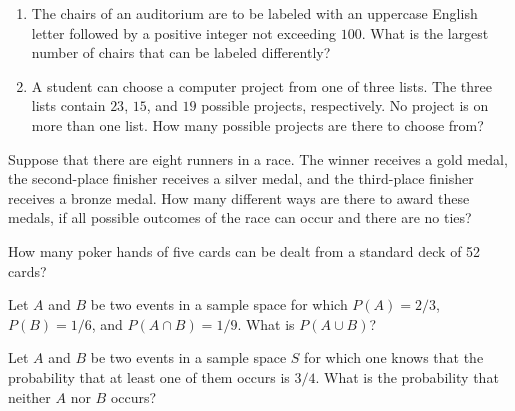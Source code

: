 \documentclass[12pt,reqno]{amsart}
\begin{document}
\bigskip
\prob

\begin{enumerate}
\item The chairs of an auditorium are to be labeled with an uppercase English letter followed by a positive integer not exceeding $100$. What is the largest number of chairs that can be labeled differently?\vfill



\item A student can choose a computer project from one of three lists. The three lists contain $23$, $15$, and $19$ possible projects, respectively. No project is on more than one list. How many possible projects are there to choose from?\vfill


\end{enumerate}









\bigskip
\prob Suppose that there are eight runners in a race. The winner receives a gold medal, the second-place finisher receives a silver medal, and the third-place finisher receives a bronze medal. How many different ways are there to award these medals, if all possible outcomes of the race can occur and there are no ties?\vfill









\prob How many poker hands of five cards can be dealt from a standard deck of 52 cards? \vfill









\newpage
\prob Let $A$ and $B$ be two events in a sample space for which $P(A) = 2/3$, $P(B) = 1/6$, and $P(A \cap B) = 1/9$. What is $P(A \cup B)$?\vfill


















\bigskip
\prob Let $A$ and $B$ be two events in a sample space $S$ for which one knows that the probability that at least one of them occurs is $3/4$. What is the probability that neither $A$ nor $B$ occurs?\vfill
\end{document}
